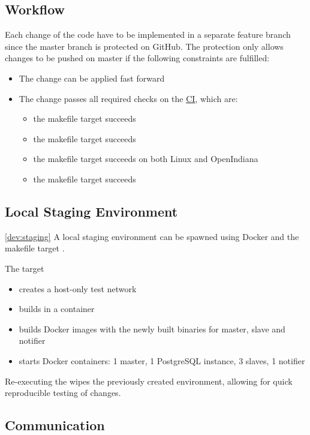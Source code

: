 \subsection{Workflow}
Each change of the code have to be implemented in a separate feature branch since the master branch is protected on GitHub. The protection 
only allows changes to be pushed on master if the following constraints are fulfilled:
\begin{itemize}
	\item The change can be applied fast forward
	\item The change passes all required checks on the \hyperref[ci]{CI}, which are:
	\begin{itemize}
		\item the  makefile target succeeds
		\item the  makefile target succeeds
		\item the  makefile target succeeds on both Linux and OpenIndiana
		\item the  makefile target succeeds
	\end{itemize}
\end{itemize}

\subsection{Local Staging Environment}\ref{dev:staging}
A local staging environment can be spawned using Docker and the makefile target .

The target
\begin{itemize}
  \item creates a host-only test network
  \item builds \mamid in a container
  \item builds Docker images with the newly built binaries for master, slave and notifier
  \item starts Docker containers: 1 master, 1 PostgreSQL instance, 3 slaves, 1 notifier
\end{itemize}

Re-executing the  wipes the previously created environment, allowing for quick reproducible testing of changes.

\subsection{Communication}

